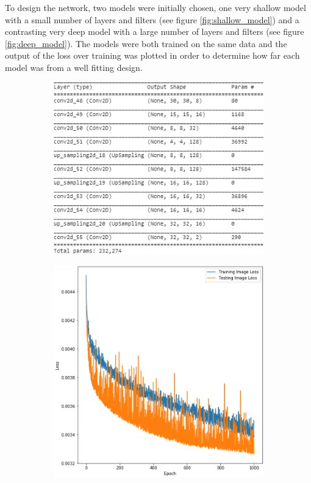 \documentclass{l4proj}
\begin{document}
To design the network, two models were initially chosen, one very shallow model with a small number of layers and filters (see figure \ref{fig:shallow_model}) and a contrasting very deep model with a large number of layers and filters (see figure \ref{fig:deep_model}). The models were both trained on the same data and the output of the loss over training was plotted in order to determine how far each model was from a well fitting design. 

\begin{figure}[h]
    \centering
    \begin{subfigure}[b]{0.5\textwidth}
        \includegraphics[width=\textwidth]{images/FinalBasicModel.PNG}
        \caption{}
    \end{subfigure}
    \quad
    \begin{subfigure}[b]{0.41\textwidth}
        \includegraphics[width=\textwidth]{images/FinalBasicModelLoss.PNG}

\end{subfigure}
\end{figure}
\end{document}
